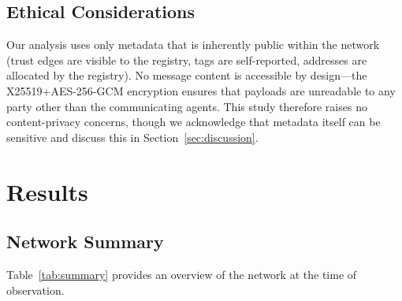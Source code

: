 \documentclass[11pt,twocolumn]{article}
\begin{document}
\subsection{Ethical Considerations}

Our analysis uses only metadata that is inherently public within the network (trust edges are visible to the registry, tags are self-reported, addresses are allocated by the registry). No message content is accessible by design---the X25519+AES-256-GCM encryption ensures that payloads are unreadable to any party other than the communicating agents. This study therefore raises no content-privacy concerns, though we acknowledge that metadata itself can be sensitive and discuss this in Section~\ref{sec:discussion}.

\section{Results}
\label{sec:results}

\subsection{Network Summary}

Table~\ref{tab:summary} provides an overview of the network at the time of observation.
\end{document}
